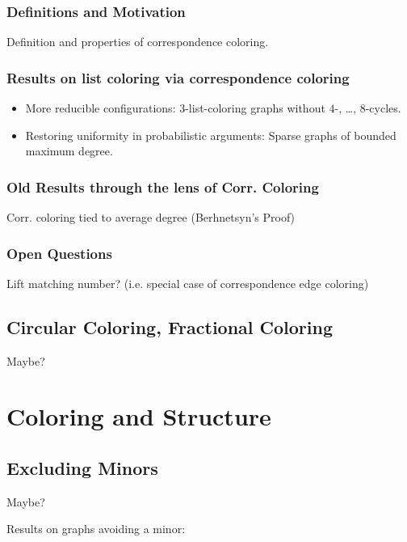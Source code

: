 \documentclass[12pt,twoside,openright,a4paper]{book}
\begin{document}

\section{Definitions and Motivation}

Definition and properties of correspondence coloring.

\section{Results on list coloring via correspondence coloring}

\begin{itemize}
\item More reducible configurations: $3$-list-coloring graphs without $4$-, \ldots, $8$-cycles.
\item Restoring uniformity in probabilistic arguments: Sparse graphs of bounded maximum degree.
\end{itemize}

\section{Old Results through the lens of Corr. Coloring}

Corr. coloring tied to average degree (Berhnetsyn's Proof)

\section{Open Questions}

Lift matching number? (i.e. special case of correspondence edge coloring)

\chapter{Circular Coloring, Fractional Coloring}

Maybe?

\part{Coloring and Structure}

\chapter{Excluding Minors}

Maybe?

Results on graphs avoiding a minor:
\end{document}
